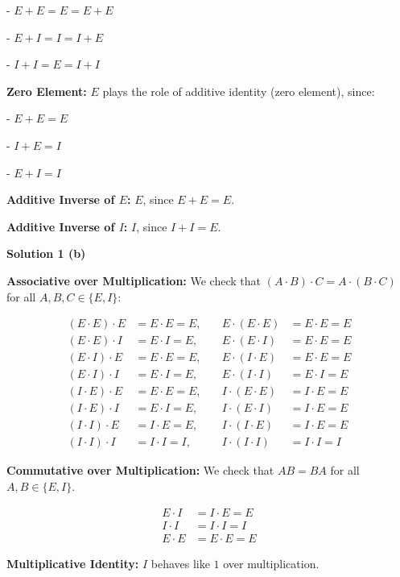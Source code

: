 - $E + E = E = E + E$

- $E + I = I = I + E$

- $I + I = E = I + I$

\textbf{Zero Element:} $E$ plays the role of additive identity (zero element), since:

- $E + E = E$

- $I + E = I$

- $E + I = I$

\textbf{Additive Inverse of $E$:} $E$, since $E + E = E$.

\textbf{Additive Inverse of $I$:} $I$, since $I + I = E$.

\textbf{Solution 1 (b)}

\textbf{Associative over Multiplication:} We check that $(A \cdot B) \cdot C = A \cdot (B \cdot C)$
for all $A, B, C \in \{E, I\}$:

\begin{align*}
( E \cdot E ) \cdot E &= E \cdot E = E, &\quad E \cdot ( E \cdot E ) &= E \cdot E = E \\
( E \cdot E ) \cdot I &= E \cdot I = E, &\quad E \cdot ( E \cdot I ) &= E \cdot E = E \\
( E \cdot I ) \cdot E &= E \cdot E = E, &\quad E \cdot ( I \cdot E ) &= E \cdot E = E \\
( E \cdot I ) \cdot I &= E \cdot I = E, &\quad E \cdot ( I \cdot I ) &= E \cdot I = E \\
( I \cdot E ) \cdot E &= E \cdot E = E, &\quad I \cdot ( E \cdot E ) &= I \cdot E = E \\
( I \cdot E ) \cdot I &= E \cdot I = E, &\quad I \cdot ( E \cdot I ) &= I \cdot E = E \\
( I \cdot I ) \cdot E &= I \cdot E = E, &\quad I \cdot ( I \cdot E ) &= I \cdot E = E \\
( I \cdot I ) \cdot I &= I \cdot I = I, &\quad I \cdot ( I \cdot I ) &= I \cdot I = I
\end{align*}

\textbf{Commutative over Multiplication:} We check that $AB = BA$ 
    for all $A, B \in \{E, I\}$.

\begin{align*}
E \cdot I &= I \cdot E = E \\
I \cdot I &= I \cdot I = I \\
E \cdot E &= E \cdot E = E
\end{align*}

\textbf{Multiplicative Identity:} $I$ behaves like $1$ over multiplication.

